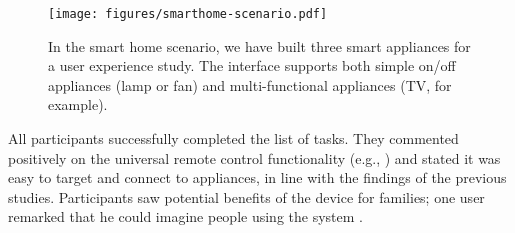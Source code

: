 

\begin{figure}[t]
\centering
\texttt{[image: figures/smarthome-scenario.pdf]}
\caption{In the smart home scenario, we have built three smart appliances for a user experience study. The interface supports both simple on/off appliances (lamp or fan) and multi-functional appliances (TV, for example).}
\label{fig:smart-home}
\end{figure}


All participants successfully completed the list of tasks. They commented positively on the universal remote control functionality (e.g., ) and stated it was easy to target and connect to appliances, in line with the findings of the previous studies. Participants saw potential benefits of the device for families; one user remarked that he could imagine people using the system .

